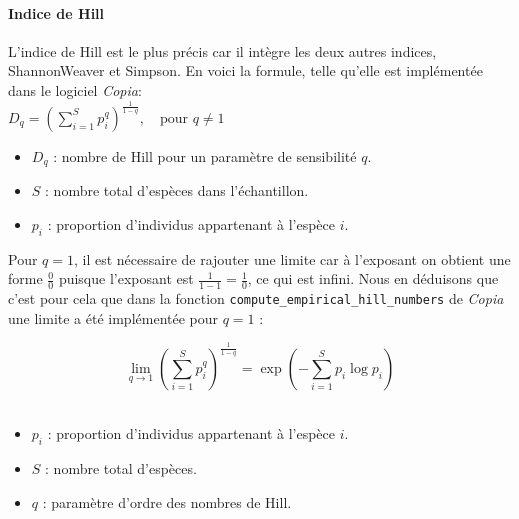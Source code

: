 \documentclass[a4paper,twoside,12pt]{book}
\begin{document}
\paragraph {Indice de Hill}

L'indice de Hill est le plus précis car il intègre les deux autres indices, Shannon\-Weaver et Simpson. En voici la formule, telle qu'elle est implémentée dans le logiciel \textit{Copia}: \\

$D_q = \left( \sum_{i=1}^{S} p_i^q \right)^{\frac{1}{1 - q}}, \quad \text{pour } q \neq 1$\\

\begin{itemize}
	\item $D_q$ : nombre de Hill pour un paramètre de sensibilité $q$.
	\item $S$ : nombre total d’espèces dans l’échantillon.
	\item $p_i$ : proportion d’individus appartenant à l’espèce $i$.\\
\end{itemize} 

Pour $q = 1$, il est nécessaire de rajouter une limite car à l'exposant on obtient une forme \(\frac{0}{0}\) puisque l’exposant est \(\frac{1}{1-1} = \frac{1}{0}\), ce qui est infini. Nous en déduisons que c'est pour cela que dans la fonction \texttt{compute\_empirical\_hill\_numbers} de \textit{Copia} une limite a été implémentée pour $q = 1$ :

\[
\lim_{q \to 1} \left( \sum_{i=1}^S p_i^q \right)^{\frac{1}{1-q}} 
= \exp\left(- \sum_{i=1}^S p_i \log p_i \right)
\]\\

\begin{itemize}
	\item \(p_i\) : proportion d’individus appartenant à l’espèce \(i\).
	\item \(S\) : nombre total d’espèces.
	\item \(q\) : paramètre d’ordre des nombres de Hill.\\
\end{itemize}
\end{document}
